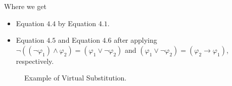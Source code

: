 Where we get 
\begin{itemize}
	\item Equation $4.4$ by Equation $4.1$.
	\item Equation $4.5$ and Equation $4.6$ after applying $\neg((\neg\varphi_{1})\wedge\varphi_{2})=(\varphi_{1} \vee \neg\varphi_{2})$ and $(\varphi_{1} \vee \neg\varphi_{2})=(\varphi_{2} \rightarrow \varphi_{1})$, respectively.
\end{itemize}
\begin{figure}[htb] %
	\begin{center}
		
	\end{center}
	\caption{Example of Virtual Substitution.}
	\label{fig:graph}
\end{figure}